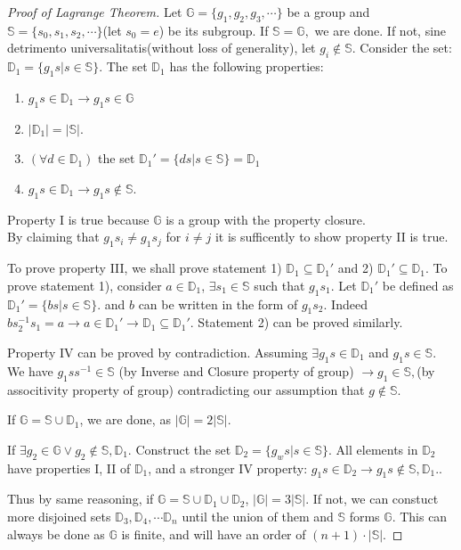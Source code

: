 \documentclass[../note.tex]{subfiles}
\begin{document}
\begin{proof}[Proof of Lagrange Theorem]
	Let $\mathbb{G}=\{g_1, g_2, g_3, \cdots \}$ be a group and $\mathbb{S}= \{s_0, s_1, s_2, \cdots\}$(let $s_0=e$) be its subgroup. 
	If $\mathbb{S}=\mathbb{G},$ we are done. If not, sine detrimento universalitatis(without loss of generality), let  $g_i \notin \mathbb{S}$. 
	Consider the set: $\mathbb{D}_1=\{g_1s|s \in \mathbb{S}\}$. The set $\mathbb{D}_1$ has the following properties:
	\begin{enumerate}
		\item $g_1s \in \mathbb{D}_1 \rightarrow g_1s \in \mathbb{G}$ 
		\item $|\mathbb{D}_1| = |\mathbb{S}|$. 
		\item $(\forall d \in \mathbb{D}_1)$ the set $\mathbb{D}_1'=\{ds|s\in \mathbb{S}\}=\mathbb{D}_1$
		\item $g_1s \in \mathbb{D}_1 \rightarrow g_1s \notin \mathbb{S}.$ 
	\end{enumerate}
	Property I is true because $\mathbb{G}$ is a group with the property closure.\\
	By claiming that $g_1s_i \neq g_1s_j$ for $i \neq j$ it is sufficently to show property II is true.
	
	To prove property III, we shall prove statement 1) $\mathbb{D}_1\subseteq \mathbb{D}_1'$ and 2) $\mathbb{D}_1'\subseteq \mathbb{D}_1$.
	To prove statement 1), consider $a\in \mathbb{D}_1$, $\exists s_1 \in \mathbb{S}$ such that $g_1s_1$. 
	Let $\mathbb{D}_1'$ be defined as $\mathbb{D}_1'=\{bs|s\in \mathbb{S}\}$. 
	and $b$ can be written in the form of $g_1s_2$. 
	Indeed $bs_2^{-1}s_1=a \rightarrow a\in \mathbb{D}_1' \rightarrow \mathbb{D}_1 \subseteq \mathbb{D}_1'.$ Statement 2) can be proved similarly.

	Property IV can be proved by contradiction. Assuming $\exists g_1s \in \mathbb{D}_1$ and $ g_1s \in \mathbb{S}.$ 
	We have $g_1ss^{-1} \in \mathbb{S}$ (by Inverse and Closure property of group) $\rightarrow g_1 \in \mathbb{S},$(by associtivity property of group) contradicting our assumption that $g \notin \mathbb{S}$.

	If $\mathbb{G}=\mathbb{S}\cup \mathbb{D}_1$, we are done, as $|\mathbb{G}| = 2|\mathbb{S}|$. 

	If $\exists g_2 \in \mathbb{G} \lor g_2 \notin \mathbb{S}, \mathbb{D}_1$. 
	Construct the set $\mathbb{D}_2=\{g_ws|s \in \mathbb{S}\}$. All elements in $\mathbb{D}_2$ have properties I, II of $\mathbb{D}_1$, and a stronger IV property: 
	$g_1s \in \mathbb{D}_2 \rightarrow g_1s \notin \mathbb{S}, \mathbb{D}_1.$.

	Thus by same reasoning, if $\mathbb{G}=\mathbb{S}\cup \mathbb{D}_1 \cup \mathbb{D}_2$, $|\mathbb{G}| = 3|\mathbb{S}|$.
	If not, we can constuct more disjoined sets $\mathbb{D}_3, \mathbb{D}_4, \cdots \mathbb{D}_n$ until the union of them and $\mathbb{S}$ forms $\mathbb{G}$. This can always be done as $\mathbb{G}$ is finite, and will have an order of $(n+1)\cdot |\mathbb{S}|. $
\end{proof}
\end{document}
